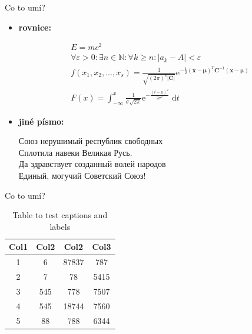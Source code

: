 \documentclass{beamer}
\begin{document}
\begin{frame}{Co to umí?}
\begin{itemize}
    \item[]\textbf{rovnice:}
    
    \begin{align}
    E = mc^2 \\
    \forall \varepsilon > 0: \exists n \in \mathbb{N} : \forall k \geq n : \left| a _k - A \right| < \varepsilon \\
    f(x_1,x_2,...,x_s) = \frac{1}{\sqrt{{(2\pi)}^s {\left|\mathbf{C}\right|}}} \mathrm{e}^{-\frac{1}{2}{\left(\mathbf{x}-\mathbf{\mu}\right)}^T \mathbf{C}^{-1} {\left(\mathbf{x}-\mathbf{\mu}\right)}} \\
    F(x) = \int_{-\infty}^x \frac{1}{\sigma\sqrt{2\pi}} \mathrm{e}^{-\frac{{(t-\mu)}^2}{2\sigma^2}} \;\mathrm{d}t
    \end{align}

    \item[]\textbf{jiné písmo:}
    
\foreignlanguage{russian}{Союз нерушимый республик свободных \\
Сплотила навеки Великая Русь. \\
Да здравствует созданный волей народов \\
Единый, могучий Советский Союз!}
\end{itemize}
\end{frame}

\begin{frame}{Co to umí?}

 \begin{table}[h!]
\centering
\begin{tabular}{||c c c c||} 
 \hline
 Col1 & Col2 & Col2 & Col3 \\ [0.5ex] 
 \hline\hline
 1 & 6 & 87837 & 787 \\ 
 2 & 7 & 78 & 5415 \\
 3 & 545 & 778 & 7507 \\
 4 & 545 & 18744 & 7560 \\
 5 & 88 & 788 & 6344 \\ [1ex] 
 \hline
\end{tabular}
\caption{Table to test captions and labels}
\label{table:1}
\end{table}


\end{frame}
\end{document}
